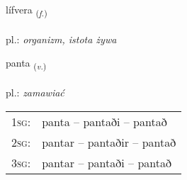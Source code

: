 \documentclass[frontgrid, backgrid]{flacards}\usepackage[]{graphicx}\usepackage[]{xcolor}
\begin{document}
\renewcommand{\flhead}{\vskip5pt \fboxsep=0pt {\small\bfseries\footnotesize Nafnorð | Noun}}
\renewcommand{\fcfoot}{\vskip5pt \fboxsep=0pt \hspace{2pt}{\small\bfseries\footnotesize 2K}}

\renewcommand{\blhead}{\vskip5pt {\small\bfseries\footnotesize Nafnorð | Noun }}
\renewcommand{\bcfoot}{\vskip5pt \hspace{2pt}{\small\bfseries\footnotesize 2K}}


{lífvera \small{\textsubscript{(\textit{f.})}} \\[1ex] %
\textphonetic{[livɛra]} \\
pl.: \emph{organizm, istota żywa} \\  [2ex]
\renewcommand*{\arraystretch}{0.8}
}

\renewcommand{\flhead}{\vskip5pt \fboxsep=0pt {\small\bfseries\footnotesize Sagnorð | Verb}}
\renewcommand{\fcfoot}{\vskip5pt \fboxsep=0pt \hspace{2pt}{\small\bfseries\footnotesize 2K}}

\renewcommand{\blhead}{\vskip5pt {\small\bfseries\footnotesize Sagnorð | Verb }}
\renewcommand{\bcfoot}{\vskip5pt \hspace{2pt}{\small\bfseries\footnotesize 2K}}


{panta \small{\textsubscript{(\textit{v.})}} \\[1ex] %
\textphonetic{[pʰan̥ta]} \\
pl.: \emph{zamawiać} \\  [2ex]
\renewcommand*{\arraystretch}{0.8}
\begin{tabular}{p{1cm}l}
\textsc{1sg}: & panta -- pantaði -- pantað \\ 
\textsc{2sg}: & pantar -- pantaðir -- pantað \\ 
\textsc{3sg}: & pantar -- pantaði -- pantað \\ 
\end{tabular}
}
\end{document}
